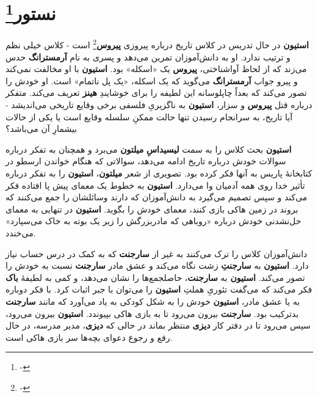 \documentclass[12pt]{book}
\newcommand{\noun}[1]{{\textbf{#1}}}
\begin{document}
    \chapter[نستور]{نستور\protect\footnote{-}}\label{ep:2}
    \noun{استیون} در حال تدریس در کلاس تاریخ درباره پیروزی \noun{پیروس}\footnote{-} است - کلاس خیلی نظم و ترتیب ندارد. او به دانش‌آموزان تمرین می‌دهد و پسری به نام \noun{آرمسترانگ} حدس می‌زند که از لحاظ آواشناختی، \noun{پیروس} یک «اسکله» بود. \noun{استیون} با او مخالفت نمی‌کند و پیرو جواب \noun{آرمسترانگ} می‌گوید که یک اسکله، «یک پل ناتمام» است. او خودش را تصور می‌کند که بعداً چاپلوسانه این لطیفه را برای خوشایندِ \noun{هینز}  تعریف می‌کند. متفکر درباره قتل \noun{پیروس} و سزار، \noun{استیون} به ناگزیریِ فلسفی برخی وقایع تاریخی می‌اندیشد - آیا تاریخ، به سرانجام رسیدن تنها حالت ممکنِ سلسله وقایع است یا یکی از حالات بیشمارِ آن می‌باشد؟

    \noun{استیون} بحث کلاس را به سمت \noun{لیسیداسِ} \noun{میلتون} می‌برد و همچنان به تفکر درباره سوالات خودش درباره تاریخ ادامه می‌دهد، سوالاتی که هنگام خواندن ارسطو در کتابخانهٔ پاریس به آنها فکر کرده بود. تصویری از شعر \noun{میلتون}، \noun{استیون} را به تفکر درباره تأثیر خدا روی همه آدمیان وا می‌دارد. \noun{استیون} به خطوط یک معمای پیش پا افتاده فکر می‌کند و سپس تصمیم می‌گیرد به دانش‌آموزان که دارند وسائلشان را جمع می‌کنند که بروند در زمین هاکی بازی کنند، معمای خودش را بگوید. \noun{استیون} در تنهایی به معمای حل‌نشدنی خودش درباره «روباهی که مادربزرگش را زیر یک بوته به خاک می‌سپارد» می‌خندد.

    دانش‌آموزان کلاس را ترک می‌کنند به غیر از \noun{سارجنت} که به کمک در درس حساب نیاز دارد. \noun{استیون} به \noun{سارجنتِ} زشت نگاه می‌کند و عشق مادر \noun{سارجنت} نسبت به خودش را تصور می‌کند. \noun{استیون} به \noun{سارجنت}، حاصلجمع‌ها را نشان می‌دهد، و کمی به لطیفهٔ \noun{باک}  فکر می‌کند که می‌گفت تئوریِ هملتِ \noun{استیون} را می‌توان با جبر اثبات کرد. با فکر دوباره به  یا عشق مادر، \noun{استیون} خودش را به شکل کودکی به یاد می‌آورد که مانند \noun{سارجنت} بدترکیب بود. \noun{سارجنت} بیرون می‌رود تا به بازی هاکی بپیوندد. \noun{استیون} بیرون می‌رود، سپس می‌رود تا در دفتر کار \noun{دیزی} منتظر بماند در حالی که \noun{دیزی}، مدیر مدرسه، در حال رفع و رجوع دعوای بچه‌ها سر بازی هاکی است.
\end{document}
